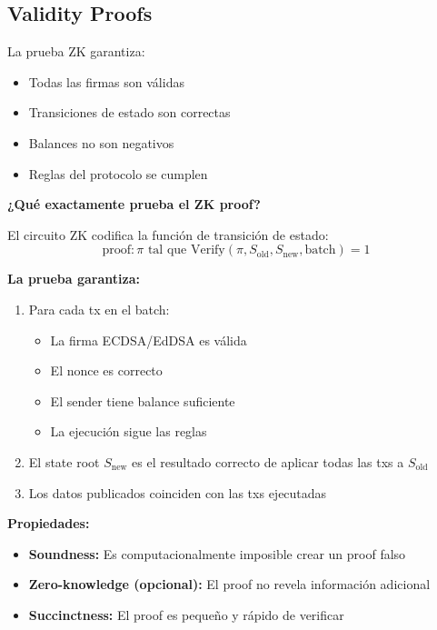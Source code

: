 \documentclass[11pt,a4paper,twoside,openright]{book}
\theoremstyle{definition}
\theoremstyle{plain}
\theoremstyle{remark}
\begin{document}
\subsection{Validity Proofs}

La prueba ZK garantiza:
\begin{itemize}
    \item Todas las firmas son válidas
    \item Transiciones de estado son correctas
    \item Balances no son negativos
    \item Reglas del protocolo se cumplen
\end{itemize}

\begin{mathnote}
\textbf{¿Qué exactamente prueba el ZK proof?}

El circuito ZK codifica la función de transición de estado:
\[ \text{proof}: \pi \text{ tal que } \text{Verify}(\pi, S_{\text{old}}, S_{\text{new}}, \text{batch}) = 1 \]

\textbf{La prueba garantiza:}
\begin{enumerate}
    \item Para cada tx en el batch:
    \begin{itemize}
        \item La firma ECDSA/EdDSA es válida
        \item El nonce es correcto
        \item El sender tiene balance suficiente
        \item La ejecución sigue las reglas
    \end{itemize}
    
    \item El state root $S_{\text{new}}$ es el resultado correcto de aplicar todas las txs a $S_{\text{old}}$
    
    \item Los datos publicados coinciden con las txs ejecutadas
\end{enumerate}

\textbf{Propiedades:}
\begin{itemize}
    \item \textbf{Soundness:} Es computacionalmente imposible crear un proof falso
    \item \textbf{Zero-knowledge (opcional):} El proof no revela información adicional
    \item \textbf{Succinctness:} El proof es pequeño y rápido de verificar
\end{itemize}
\end{mathnote}
\end{document}
